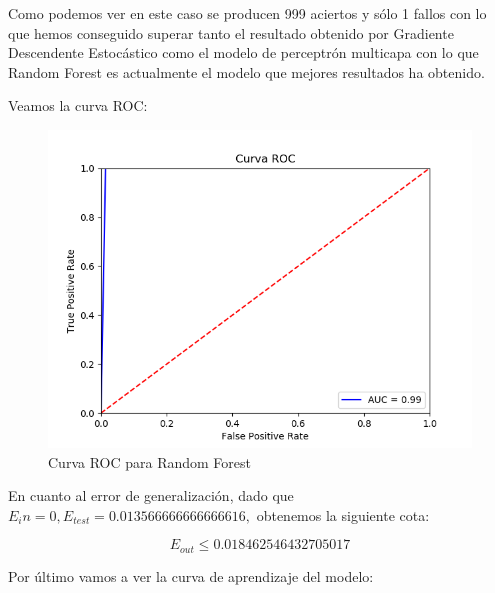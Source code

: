 Como podemos ver en este caso se producen 999 aciertos y sólo 1 fallos con lo que hemos conseguido superar tanto el resultado obtenido por Gradiente Descendente Estocástico como el modelo de perceptrón multicapa con lo que Random Forest es actualmente el modelo que mejores resultados ha obtenido.

Veamos la curva ROC:

\begin{figure}[H] %
	\centering
	\includegraphics[scale=0.6]{ROC-RF.png}  %
	\caption{Curva ROC para Random Forest} 
	\label{fig:roc-rf}
\end{figure}

En cuanto al error de generalización, dado que $E_in=0, E_{test} = 0.013566666666666616,$ obtenemos la siguiente cota:

$$E_{out} \leq 0.018462546432705017$$

Por último vamos a ver la curva de aprendizaje del modelo:

